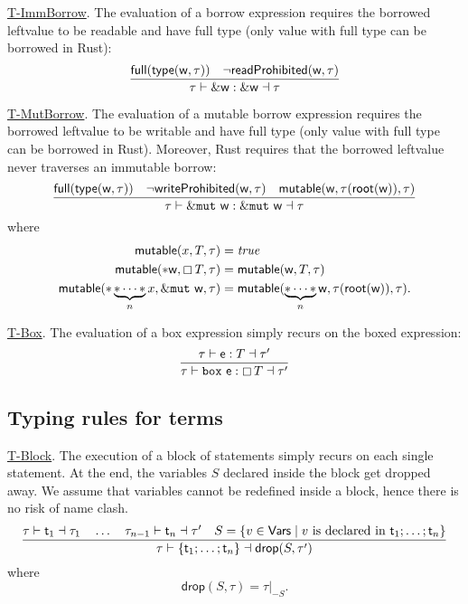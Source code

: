 \noindent
\underline{\textsf{T-ImmBorrow}}.
The evaluation of a borrow expression requires the borrowed leftvalue
to be readable and have full type
(only value with full type can be borrowed in Rust):
\[
\frac
    {\mathsf{full}(\mathsf{type}(\mathsf{w},\tau))\quad\neg\mathsf{readProhibited}(\mathsf{w},\tau)}
    {\tau\vdash\&\mathsf{w}:\&\mathsf{w}\dashv\tau}
\]

\noindent
\underline{\textsf{T-MutBorrow}}.
The evaluation of a mutable borrow expression requires the borrowed
leftvalue to be writable and have full type
(only value with full type can be borrowed in Rust). Moreover, Rust requires that
the borrowed leftvalue never traverses an immutable borrow:
\[
\frac
    {\mathsf{full}(\mathsf{type}(\mathsf{w},\tau))\quad\neg\mathsf{writeProhibited}(\mathsf{w},\tau)
    \quad\mathsf{mutable}(\mathsf{w},\tau(\mathsf{root}(\mathsf{w})),\tau)}
    {\tau\vdash\&\mathtt{mut}\ \mathsf{w}:\&\mathtt{mut}\ \mathsf{w}\dashv\tau}
\]
where
\begin{align*}
  \mathsf{mutable}(x,T,\tau)&=\mathit{true}\\
  \mathsf{mutable}(\mathtt{*}\mathsf{w},\boxempty\,{T},\tau)&=\mathsf{mutable}(\mathsf{w},T,\tau)\\
  \mathsf{mutable}(\mathtt{*}\underbrace{\mathtt{*}\cdots\mathtt{*}}_nx,
  \&\mathtt{mut}\ \mathsf{w},\tau)&=\mathsf{mutable}(\underbrace{\mathtt{*}\cdots\mathtt{*}}_n\mathsf{w},
  \tau(\mathsf{root}(\mathsf{w})),\tau).
\end{align*}

\noindent
\underline{\textsf{T-Box}}.
The evaluation of a box expression simply recurs on the boxed expression:
\[
\frac
    {\tau\vdash\mathsf{e}:T\dashv\tau'}
    {\tau\vdash\mathtt{box}\ \mathsf{e}:\boxtype{T}\dashv\tau'}
\]

\subsection{Typing rules for terms}

\noindent
\underline{\textsf{T-Block}}.
The execution of a block of statements simply recurs on each single statement.
At the end, the variables $S$ declared inside the block get dropped away. We assume
that variables cannot be redefined inside a block, hence there is no risk of name clash.
\[
\frac
    {\tau\vdash\mathsf{t}_1\dashv\tau_1\quad\ldots\quad\tau_{n-1}\vdash\mathsf{t}_n\dashv\tau'
    \quad S=\{v\in\mathsf{Vars}\mid v\text{ is declared in }\mathsf{t}_1;\ldots;\mathsf{t}_n\}}
    {\tau\vdash\{\mathsf{t}_1;\ldots;\mathsf{t}_n\}\dashv\mathsf{drop}(S,\tau')}
\]
where
\[
\mathsf{drop}(S,\tau)=\tau|_{-S}.
\]

